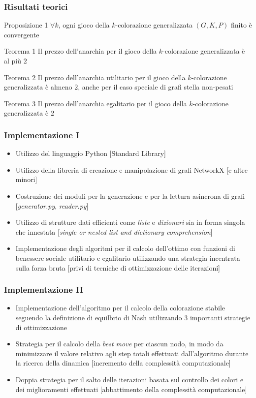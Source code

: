 \documentclass{beamer}
\begin{document}
\begin{frame}
\frametitle{Risultati teorici}
	\begin{alertblock}{Proposizione 1}
		$\forall k$, ogni gioco della $k$-colorazione generalizzata $(G,K,P)$ finito è convergente
	\end{alertblock}
	\begin{alertblock}{Teorema 1}
		Il prezzo dell'anarchia per il gioco della $k$-colorazione generalizzata è al più $2$ 
	\end{alertblock}	
	\begin{alertblock}{Teorema 2}
		Il prezzo dell'anarchia utilitario per il gioco della $k$-colorazione generalizzata è almeno $2$, anche per il caso speciale di grafi stella non-pesati
	\end{alertblock}	
	\begin{alertblock}{Teorema 3}
		Il prezzo dell'anarchia egalitario per il gioco della $k$-colorazione generalizzata è $2$ 
	\end{alertblock}	
\end{frame}


\begin{frame}
\frametitle{Implementazione I}
\begin{itemize}
	\item Utilizzo del linguaggio \alert{Python} [Standard Library]
	\item Utilizzo della libreria di creazione e manipolazione di grafi \alert{NetworkX} [e altre minori]
	\item Costruzione dei moduli per la generazione e per la lettura asincrona di grafi [\textit{generator.py}, \textit{reader.py}]
	\item Utilizzo di \alert{strutture dati} efficienti come \textit{liste} e \textit{dizionari} sia in forma singola che innestata [\textit{single or nested list and dictionary comprehension}]
	\item Implementazione degli \alert{algoritmi per il calcolo dell'ottimo} con funzioni di benessere sociale utilitario e egalitario utilizzando una strategia incentrata sulla forza bruta [privi di tecniche di ottimizzazione delle iterazioni]
\end{itemize}
\end{frame}


\begin{frame}
\frametitle{Implementazione II}
\begin{itemize}
	\item Implementazione dell'\alert{algoritmo per il calcolo della colorazione stabile} seguendo la definizione di equilbrio di Nash utilizzando 3 importanti strategie di ottimizzazione
	\item \alert{Strategia} per il calcolo della \textit{\alert{best move}} per ciascun nodo, in modo da minimizzare il valore relativo agli step totali effettuati dall'algoritmo durante la ricerca della dinamica [incremento della complessità computazionale]
	\item \alert{Doppia strategia} per il \alert{salto delle iterazioni} basata sul controllo dei colori e dei miglioramenti effettuati [abbattimento della complessità computazionale]
\end{itemize}
\end{frame}
\end{document}
